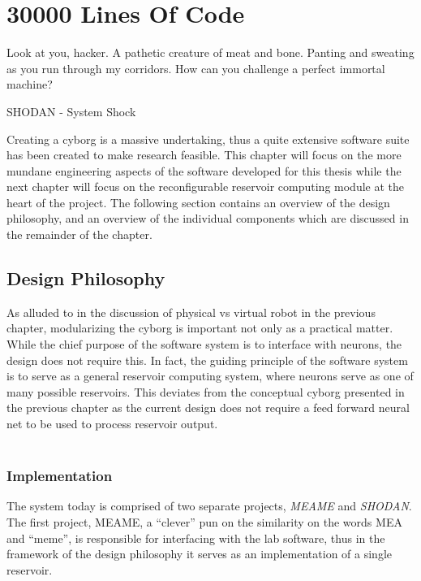 \chapter{30000 Lines Of Code}
\epigraph{Look at you, hacker. A pathetic creature of meat and bone. Panting and
sweating as you run through my corridors. How can you challenge a perfect
immortal machine?}
{SHODAN - System Shock}
Creating a cyborg is a massive undertaking, thus a quite extensive software
suite has been created to make research feasible.
This chapter will focus on the more mundane engineering aspects of the software
developed for this thesis while the next chapter will focus on the
reconfigurable reservoir computing module at the heart of the project.
The following section contains an overview of the design philosophy, and an
overview of the individual components which are discussed in the remainder of
the chapter.
\section{Design Philosophy}
As alluded to in the discussion of physical vs virtual robot in the previous
chapter, modularizing the cyborg is important not only as a practical matter.
While the chief purpose of the software system is to interface with neurons, the
design does not require this.
In fact, the guiding principle of the software system is to serve as a general
reservoir computing system, where neurons serve as one of many possible reservoirs.
This deviates from the conceptual cyborg presented in the previous chapter as
the current design does not require a feed forward neural net to be used to
process reservoir output.\\
\\
\subsection{Implementation}
The system today is comprised of two separate projects, \emph{MEAME} and
\emph{SHODAN}.
The first project, MEAME, a ``clever'' pun on the similarity on the words MEA
and ``meme'', is responsible for interfacing with the lab software,
thus in the framework of the design philosophy it serves as an implementation
of a single reservoir.
